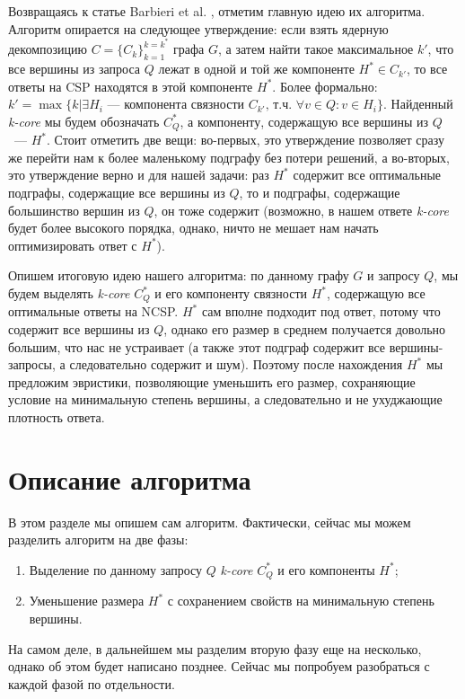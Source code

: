 \documentclass[11pt,a4paper,oneside]{article}
\begin{document}
Возвращаясь к статье Barbieri et al. \cite{Barbieri15}, отметим главную идею их алгоритма. Алгоритм опирается на следующее утверждение: если взять ядерную декомпозицию $C = \{C_k\}_{k=1}^{k=k^*}$ графа $G$, а затем найти такое максимальное $k'$, что все вершины из запроса $Q$ лежат в одной и той же компоненте $H^* \in C_{k'}$, то все ответы на CSP находятся в этой компоненте $H^*$. Более формально: $k' = \max\{k | \exists H_i\mbox{~--- компонента связности } C_{k'}\mbox{, т.ч. } \forall v \in Q: v \in H_i\}$. Найденный \textit{k-core} мы будем обозначать $C_Q^*$, а компоненту, содержащую все вершины из $Q$~--- $H^*$. Стоит отметить две вещи: во-первых, это утверждение позволяет сразу же перейти нам к более маленькому подграфу без потери решений, а во-вторых, это утверждение верно и для нашей задачи: раз $H^*$ содержит все оптимальные подграфы, содержащие все вершины из $Q$, то и подграфы, содержащие большинство вершин из $Q$, он тоже содержит (возможно, в нашем ответе \textit{k-core} будет более высокого порядка, однако, ничто не мешает нам начать оптимизировать ответ с $H^*$).

Опишем итоговую идею нашего алгоритма: по данному графу $G$ и запросу $Q$, мы будем выделять \textit{k-core} $C_Q^*$ и его компоненту связности $H^*$, содержащую все оптимальные ответы на NCSP. $H^*$ сам вполне подходит под ответ, потому что содержит все вершины из $Q$, однако его размер в среднем получается довольно большим, что нас не устраивает (а также этот подграф содержит все вершины-запросы, а следовательно содержит и шум). Поэтому после нахождения $H^*$ мы предложим эвристики, позволяющие уменьшить его размер, сохраняющие условие на минимальную степень вершины, а следовательно и не ухуджающие плотность ответа.

\section{Описание алгоритма}

В этом разделе мы опишем сам алгоритм. Фактически, сейчас мы можем разделить алгоритм на две фазы:

\begin{enumerate}
  \item Выделение по данному запросу $Q$ \textit{k-core} $C_Q^*$ и его компоненты $H^*$;
  \item Уменьшение размера $H^*$ с сохранением свойств на минимальную степень вершины.
\end{enumerate}

На самом деле, в дальнейшем мы разделим вторую фазу еще на несколько, однако об этом будет написано позднее. Сейчас мы попробуем разобраться с каждой фазой по отдельности.
\end{document}
